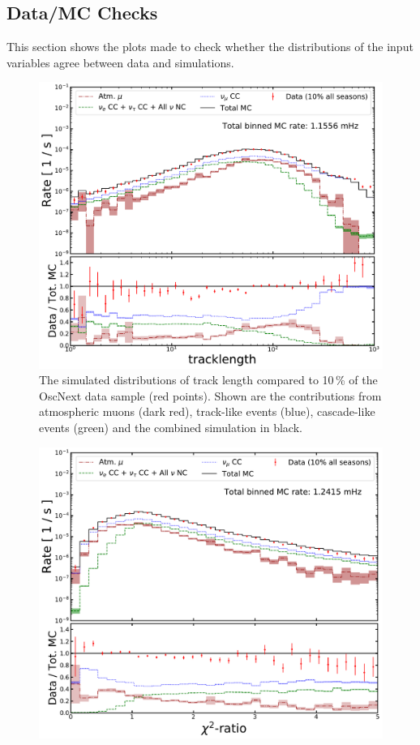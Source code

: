 \begin{appendices}    
    
\chapter{Data/MC Checks} \label{app:data_mc_checks}

This section shows the plots made to check whether the distributions of the input variables agree between data and simulations.

\begin{figure}[h]
    \centering
    \includegraphics[width=0.75\linewidth]{figures/L7_SANTA_classifier_length_14_bigger.pdf}
    \caption[The simulated distribution of track length compared to 10\,\% of the OscNext data sample]{The simulated distributions of track length compared to 10\,\% of the OscNext data sample (red points). Shown are the contributions from atmospheric muons (dark red), track-like events (blue), cascade-like events (green) and the combined simulation in black.}
    \label{fig:data_mc_tracklength}
\end{figure}

\begin{figure}[h]
	\centering
    \includegraphics[width=0.75\linewidth]{figures/L7_SANTA_classifier_santapid_14_bigger.pdf}
    

\end{figure}
\end{appendices}
